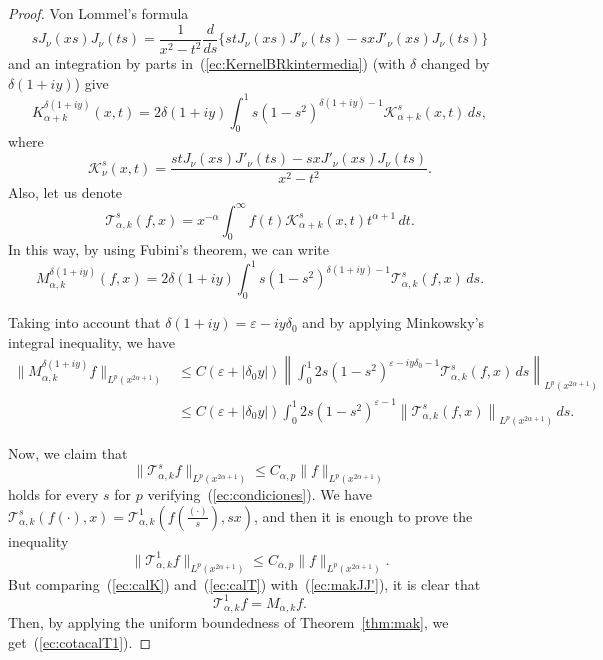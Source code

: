 \documentclass{amsart}
\theoremstyle{remark}
\newcommand{\mak}{M_{\alpha,k}}
\newcommand{\BRkd}[1]{M_{\alpha,k}^{\delta(#1)}} %
\newcommand{\KBRkd}[1]{K_{\alpha+k}^{\delta(#1)}} %
\newcommand{\calT}[1][s]{\mathcal{T}^{#1}_{\alpha,k}}
\newcommand{\calK}[1][\alpha+k]{\mathcal{K}^s_{#1}}
\newcommand{\lpnorm}[2]{\|{#1}\|_{L^{#2}(x^{2\alpha+1})}}
\newcommand{\biglpnorm}[2]{\left\|{#1}\right\|_{L^{#2}(x^{2\alpha+1})}}
\begin{document}
\begin{proof}
Von Lommel's formula
\begin{equation*}
    sJ_{\nu}(xs)J_{\nu}(ts) = \frac{1}{x^2-t^2}
      \frac{d}{ds} \{stJ_{\nu}(xs)J'_{\nu}(ts) - sxJ'_{\nu}(xs)J_{\nu}(ts)\}
\end{equation*}
and an integration by parts in~(\ref{ec:KernelBRkintermedia}) (with $\delta$
changed by $\delta(1+iy)$) give
\begin{equation*}
    \KBRkd{1+iy}(x,t)
    = 2 \delta(1+iy) \int_0^1 s(1-s^2)^{\delta(1+iy)-1} \calK(x,t) \, ds,
\end{equation*}
where
\begin{equation}
\label{ec:calK}
    \calK[\nu](x,t)
    = \frac{stJ_{\nu}(xs)J'_{\nu}(ts)
        - sxJ'_{\nu}(xs)J_{\nu}(ts)}{x^2-t^2}.
\end{equation}
Also, let us denote
\begin{equation}
\label{ec:calT}
    \calT(f,x)
    = x^{-\alpha} \int_0^{\infty} f(t) \calK(x,t) t^{\alpha+1} \, dt.
\end{equation}
In this way, by using Fubini's theorem, we can write
\begin{equation*}
    \BRkd{1+iy}(f,x)
    = 2 \delta(1+iy) \int_0^1 s(1-s^2)^{\delta(1+iy)-1} \calT(f,x) \, ds.
\end{equation*}

Taking into account that $\delta(1+iy) = \varepsilon-iy\delta_0$ and by
applying Minkowsky's integral inequality, we have
\begin{align*}
    \lpnorm{\BRkd{1+iy}f}{p} 
    & \le C (\varepsilon+|\delta_0y|)
        \biglpnorm{\int_0^1 2s(1-s^2)^{\varepsilon-iy\delta_0-1}
          \calT(f,x) \, ds}{p} \\
    & \le C (\varepsilon+|\delta_0y|) \int_0^1 2s(1-s^2)^{\varepsilon-1}
        \biglpnorm{\calT(f,x)}{p} \, ds.
\end{align*}

Now, we claim that
\begin{equation*}
    \lpnorm{\calT f}{p}
    \le C_{\alpha,p} \lpnorm{f}{p}
\end{equation*}
holds for every $s$ for $p$ verifying~(\ref{ec:condiciones}).
We have
$\calT(f(\cdot),x) = \calT[1](f(\frac{(\cdot)}s),sx)$,
and then it is enough to prove the inequality
\begin{equation}
\label{ec:cotacalT1}
    \lpnorm{\calT[1]f}{p} \le C_{\alpha,p} \lpnorm{f}{p}.
\end{equation}
But comparing~(\ref{ec:calK}) and~(\ref{ec:calT}) with~(\ref{ec:makJJ'}), it
is clear that
\begin{equation*}
    \calT[1]f = \mak f.
\end{equation*}
Then, by applying the uniform boundedness of Theorem~\ref{thm:mak}, we
get~(\ref{ec:cotacalT1}).


\end{proof}
\end{document}
